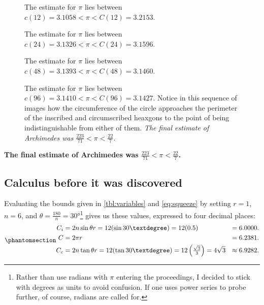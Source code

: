 \documentclass[
  a4paper,
]{article}
\begin{document}
\begin{figure}
\centering

\caption{The estimate for \(\pi\) lies between
\(c(12) = 3.1058 < \pi < C(12) = 3.2153\).}\label{fig:twelve-gon}
\end{figure}

\begin{figure}
\centering

\caption{The estimate for \(\pi\) lies between
\(c(24) = 3.1326 < \pi < C(24) = 3.1596\).}\label{fig:twenty-four-gon}
\end{figure}

\begin{figure}
\centering

\caption{The estimate for \(\pi\) lies between
\(c(48) = 3.1393 < \pi < C(48) = 3.1460\).}\label{fig:forty-eight-gon}
\end{figure}

\begin{figure}
\centering

\caption{The estimate for \(\pi\) lies between
\(c(96) = 3.1410 < \pi < C(96) = 3.1427\). Notice in this sequence of
images how the circumference of the circle approaches the perimeter of
the inscribed and circumscribed heaxgons to the point of being
indistinguishable from either of them. \emph{The final estimate of
Archimedes was
\(\frac{223}{71} < \pi < \frac{22}{7}\).}}\label{fig:ninety-six-gon}
\end{figure}

\textbf{The final estimate of Archimedes was
\(\frac{223}{71} < \pi < \frac{22}{7}\).}

\subsection{Calculus before it was
discovered}\label{calculus-before-it-was-discovered}

Evaluating the bounds given in \cref{tbl:variables} and
\cref{eq:squeeze} by setting \(r = 1\), \(n = 6\), and
\(\theta = \frac{180}{n} = 30°\)\footnote{Rather than use radians with
  \(\pi\) entering the proceedings, I decided to stick with degrees as
  units to avoid confusion. If one uses power series to probe further,
  of course, radians are called for.} gives us these values, expressed
to four decimal places:
\begin{equation}\phantomsection\label{eq:triple-6}{
\begin{aligned}
C_i &= 2n\sin\theta r = 12(\sin 30°) = 12(0.5) &= 6.0000.\\
C &= 2\pi r &= 6.2381.\\
C_c &= 2n\tan\theta r = 12(\tan 30°) = 12\left(\tfrac{\sqrt{3}}{3}\right) = 4\sqrt{3} &\approx 6.9282.\\
\end{aligned}
}\end{equation}
\end{document}
